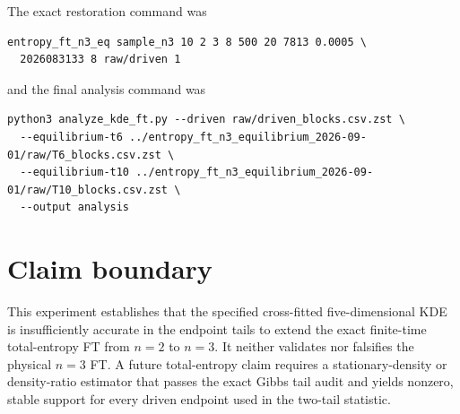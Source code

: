 \documentclass[11pt]{article}
\begin{document}
The exact restoration command was
\begin{verbatim}
entropy_ft_n3_eq sample_n3 10 2 3 8 500 20 7813 0.0005 \
  2026083133 8 raw/driven 1
\end{verbatim}
and the final analysis command was
\begin{verbatim}
python3 analyze_kde_ft.py --driven raw/driven_blocks.csv.zst \
  --equilibrium-t6 ../entropy_ft_n3_equilibrium_2026-09-01/raw/T6_blocks.csv.zst \
  --equilibrium-t10 ../entropy_ft_n3_equilibrium_2026-09-01/raw/T10_blocks.csv.zst \
  --output analysis
\end{verbatim}

\section*{Claim boundary}

This experiment establishes that the specified cross-fitted five-dimensional
KDE is insufficiently accurate in the endpoint tails to extend the exact
finite-time total-entropy FT from $n=2$ to $n=3$.  It neither validates nor
falsifies the physical $n=3$ FT.  A future total-entropy claim requires a
stationary-density or density-ratio estimator that passes the exact Gibbs
tail audit and yields nonzero, stable support for every driven endpoint used in
the two-tail statistic.
\end{document}
